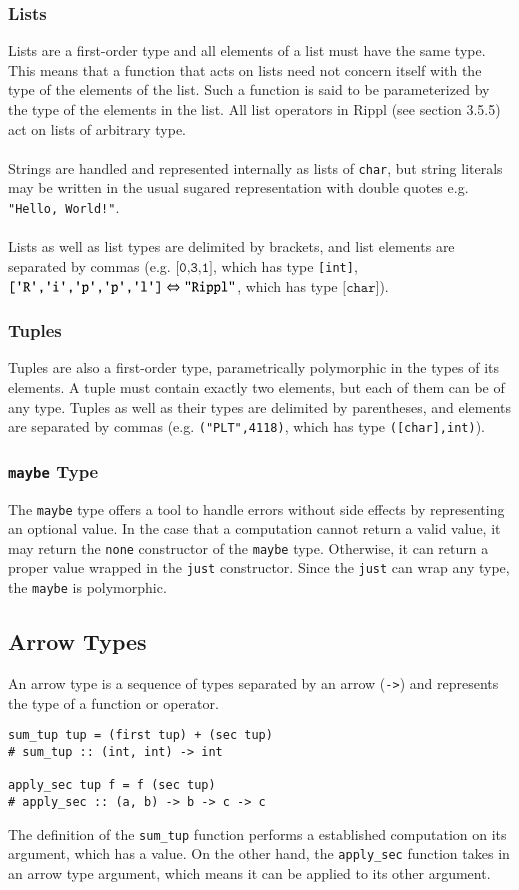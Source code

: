 \documentclass[5pt]{article}
\newcommand{\sq}{\textquotesingle}
\begin{document}
\subsubsection{Lists}
Lists are a first-order type and all elements of a list must have the same type. This means that a function that acts on lists need not concern itself with the type of the elements of the list. Such a function is said to be parameterized by the type of the elements in the list. All list operators in Rippl (see section 3.5.5) act on lists of arbitrary type. \\\\
Strings are handled and represented internally as lists of \texttt{char}, but
string literals may be written in the usual sugared representation with double quotes e.g. \texttt{"Hello, World!"}.\\\\
Lists as well as list types are delimited by brackets, and list elements are separated by commas (e.g. $\texttt{[0,3,1]}$, which has type \texttt{[int]}, $\texttt{[\sq R\sq,\sq i\sq,\sq p\sq,\sq p\sq,\sq l\sq]}\Leftrightarrow \texttt{"Rippl"}$, which has type $\texttt{[char]}$).

\subsubsection{Tuples}
Tuples are also a first-order type, parametrically polymorphic in the types of its elements. A tuple must contain exactly two elements, but each of them can be of any type. Tuples as well as their types are delimited by parentheses, and elements are separated by commas (e.g. \texttt{("PLT",4118)}, which has type \texttt{([char],int)}).

\subsubsection{\texttt{maybe} Type}
The \texttt{maybe} type offers a tool to handle errors without side effects by representing an optional value. In the case that a computation cannot return a valid value, it may return the \texttt{none} constructor of the \texttt{maybe} type. Otherwise, it can return a proper value wrapped in the \texttt{just} constructor. Since the \texttt{just} can wrap any type, the \texttt{maybe} is polymorphic.

\subsection{Arrow Types}
An arrow type is a sequence of types separated by an arrow (\texttt{->}) and represents the type of a function or operator. %
\begin{lstlisting}[language=rippl]
sum_tup tup = (first tup) + (sec tup)
# sum_tup :: (int, int) -> int

apply_sec tup f = f (sec tup)
# apply_sec :: (a, b) -> b -> c -> c
\end{lstlisting}
The definition of the \texttt{sum\_tup} function performs a established computation on its argument, which has a value. On the other hand, the \texttt{apply\_sec} function takes in an arrow type argument, which means it can be applied to its other argument.
\end{document}
